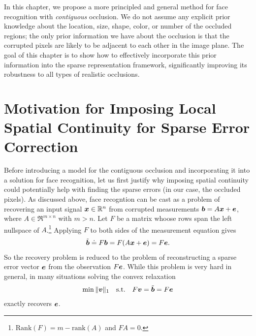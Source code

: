 In this chapter, we propose a more principled and general method for face
recognition with {\em contiguous} occlusion. We do not assume any explicit
prior knowledge about the location, size, shape, color, or number of the
occluded regions; the only prior information we have about the occlusion is
that the corrupted pixels are likely to be adjacent to each other in the image
plane. The goal of this chapter is to show how to effectively incorporate this
prior information into the sparse representation framework, significantly
improving its robustness to all types of realistic occlusions.

\section{Motivation for Imposing Local Spatial Continuity for Sparse Error Correction}
Before introducing a model for the contiguous occlusion and incorporating it into a solution for face recognition, let us first justify why imposing spatial continuity could potentially help with finding the sparse errors (in our case, the occluded pixels). As discussed above, face recogntion can be cast as a problem of recovering an input signal ${\boldsymbol{x}}\in \mathbb R^n$ from corrupted measurements $\boldsymbol{b} = A{\boldsymbol{x}}+\boldsymbol{e}$, where $A\in
\Re^{m\times n}$ with $m>n$. Let $F$ be a matrix whoose rows span the left nullspace of
$A$.\footnote{$\mathrm{Rank}(F) = m - \mathrm{rank}(A)$ and $FA=0$.} Applying $F$ to both sides of the measurement equation gives \vspace{0mm}
\begin{displaymath}
\tilde{\bb} \doteq F \bb = F(A \x+ \e) = F\e. \vspace{0mm}
\end{displaymath}
So the recovery problem is reduced to the problem of reconstructing
a sparse error vector $\boldsymbol{e}$ from the observation $F \boldsymbol{e}$. While this problem is very hard in general, in many situations solving the convex relaxation \vspace{0mm}
\begin{equation*}
\min \| \mathbf{v} \|_1 \quad \textup{s.t.} \quad F \mathbf{v} = \tilde{\bb} = F \e \vspace{0mm}
\end{equation*}
exactly recovers $\boldsymbol{e}$.

